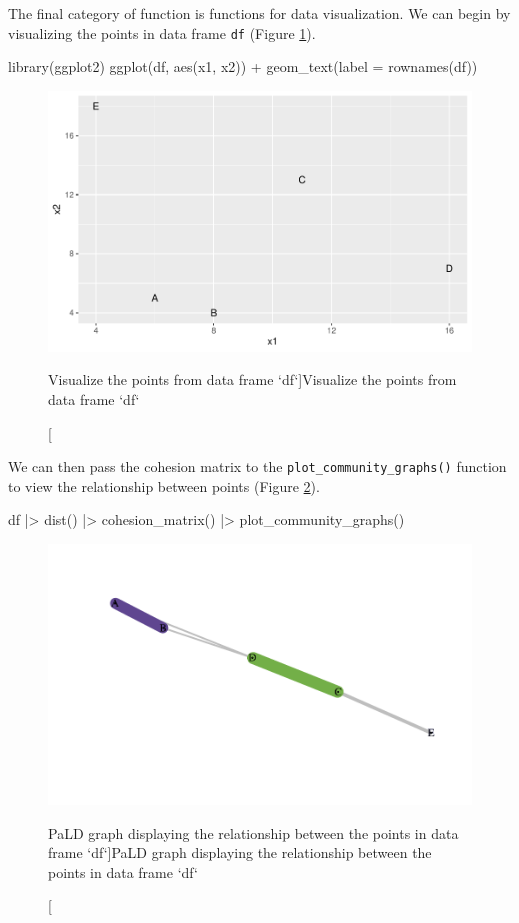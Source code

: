 The final category of function is functions for data visualization. We
can begin by visualizing the points in data frame \texttt{df} (Figure
\ref{fig:fig1}).

\begin{Schunk}
\begin{Sinput}
library(ggplot2)
ggplot(df, aes(x1, x2)) +
  geom_text(label = rownames(df))
\end{Sinput}
\begin{figure}
\includegraphics{manuscript_files/figure-latex/fig1-1} \caption[Visualize the points from data frame `df`]{Visualize the points from data frame `df`}\label{fig:fig1}
\end{figure}
\end{Schunk}

We can then pass the cohesion matrix to the
\texttt{plot\_community\_graphs()} function to view the relationship
between points (Figure \ref{fig:fig2}).

\begin{Schunk}
\begin{Sinput}
df |>
  dist() |>
  cohesion_matrix() |>
  plot_community_graphs()
\end{Sinput}
\begin{figure}
\includegraphics{manuscript_files/figure-latex/fig2-1} \caption[PaLD graph displaying the relationship between the points in data frame `df`]{PaLD graph displaying the relationship between the points in data frame `df`}\label{fig:fig2}
\end{figure}
\end{Schunk}

